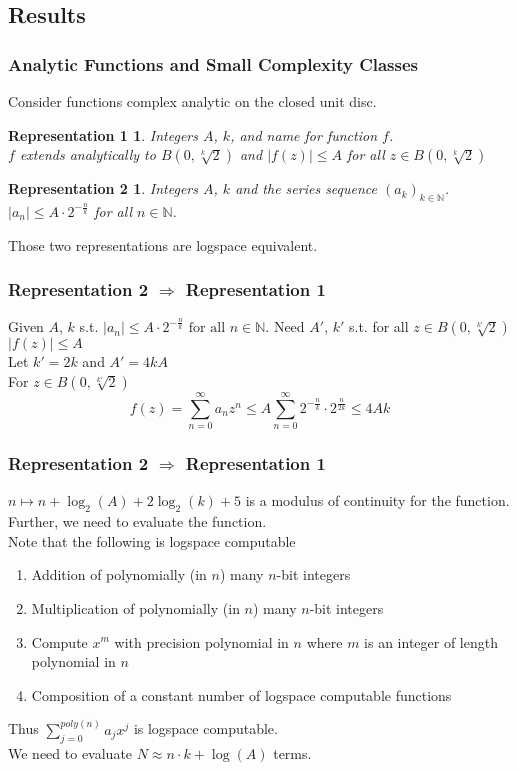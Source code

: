 \documentclass[xcolor=pdftex,dvipsnames,table]{beamer}
\newcommand{\N}{\ensuremath{\mathbb{N}}}
\newcommand{\abs}[1]{\left|#1\right|}
\newtheorem{representation1}{Representation 1}
\newtheorem{representation2}{Representation 2}
\begin{document}
\subsection*{Results}
\begin{frame}
\frametitle{Analytic Functions and Small Complexity Classes}
  Consider functions complex analytic on the closed unit disc.
\begin{representation1}
  Integers $A$, $k$, and name for function $f$.\\
  $f$ extends analytically to $B(0, \sqrt[k]{2})$ and $\abs{f(z)} \leq A$ for all $z \in B(0, \sqrt[k]{2})$
\end{representation1}
\begin{representation2}
  Integers $A$, $k$ and the series sequence $(a_k)_{k \in \N}$.\\
  $\abs{a_n} \leq A \cdot 2^{-\frac{n}{k}}$ for all $n \in \N$.
\end{representation2}
Those two representations are logspace equivalent.
\end{frame}
\begin{frame}
\frametitle{Representation 2 $\Rightarrow$ Representation 1}
Given $A$, $k$ s.t. 
  $\abs{a_n} \leq A \cdot 2^{-\frac{n}{k}} \text{ for all } n \in \N.$
Need $A'$, $k'$ s.t. for all $z \in B(0, \sqrt[k']{2})$
$\abs{f(z)} \leq A$\\
\vfill
\pause
Let $k' = 2k$ and $A' = 4kA$ \\
For $z \in B(0, \sqrt[k']{2})$
$$f(z) = \sum_{n=0}^\infty a_nz^n \leq A\sum_{n=0}^\infty 2^{-\frac{n}{k}} \cdot 2^{\frac{n}{2k}} \leq 4Ak$$
\end{frame}
\begin{frame}
\frametitle{Representation 2 $\Rightarrow$ Representation 1}
$n \mapsto n+\log_2(A)+2\log_2(k)+5$ is a modulus of continuity for the function.\\
\pause
Further, we need to evaluate the function.\\
Note that the following is logspace computable 
\begin{enumerate}
\item Addition of polynomially (in $n$) many $n$-bit integers
\item Multiplication of polynomially (in $n$) many $n$-bit integers
\item Compute $x^m$ with precision polynomial in $n$ where $m$ is an integer of length polynomial in $n$
 \item Composition of a constant number of logspace computable functions
\end{enumerate}
\pause
Thus $\sum_{j=0}^{poly(n)} a_jx^j$ is logspace computable.\\
We need to evaluate $N \approx n \cdot k + \log(A)$ terms.
\end{frame}
\end{document}
